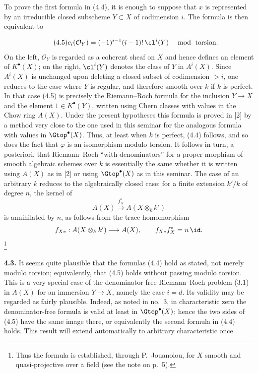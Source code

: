 To prove the first formula in (4.4), it is enough to suppose that $x$ is
represented by an irreducible closed subscheme $Y\subset X$ of codimension
$i$. The formula is then equivalent to

\begin{equation}\tag{4.5}
 c_i(\mathcal O_Y)=(-1)^{i-1}(i-1)!\,\cl^i(Y)
   \quad\bmod\text{ torsion}.
\end{equation}
On the left, $\mathcal O_Y$ is regarded as a coherent sheaf on $X$ and
hence defines an element of $K^\bullet(X)$; on the right,
$\cl^i(Y)$ denotes the class of $Y$ in $A^i(X)$. Since $A^i(X)$ is
unchanged upon deleting a closed subset of codimension $>i$, one reduces
to the case where $Y$ is regular, and therefore smooth over $k$ if $k$ is
perfect. In that case (4.5) is precisely the Riemann--Roch formula for the
inclusion $Y\to X$ and the element $1\in K^\bullet(Y)$, written using
Chern classes with values in the Chow ring $A(X)$. Under the present
hypotheses this formula is proved in [2] by a method very close to the one
used in this seminar for the analogous formula with values in
$\Gtop^\bullet(X)$. Thus, at least when $k$ is perfect, (4.4) follows, and
so does the fact that $\varphi$ is an isomorphism modulo torsion. It follows
in turn, a posteriori, that Riemann--Roch ``with denominators'' for a proper
morphism of smooth algebraic schemes over $k$ is essentially the same
whether it is written using $A(X)$ as in [2] or using $\Gtop^\bullet(X)$ as
in this seminar. The case of an arbitrary $k$ reduces to the algebraically
closed case: for a finite extension $k'/k$ of degree $n$, the kernel of
\[
 A(X)\xrightarrow{f_X^*}A(X\otimes_k k')
\]
is annihilated by $n$, as follows from the trace homomorphism
\[
 f_{X*}:A(X\otimes_k k')\longrightarrow A(X),
 \qquad f_{X*}f_X^*=n\,\id.
\]
\footnote{Thus the formula is established, through P.~Jouanolou, for $X$
smooth and quasi-projective over a field (see the note on p.~5).}

\textbf{4.3.} It seems quite plausible that the formulas (4.4) hold as
stated, not merely modulo torsion; equivalently, that (4.5) holds without
passing modulo torsion. This is a very special case of the denominator-free
Riemann--Roch problem (3.1) in $A(X)$ for an immersion $Y\to X$, namely
the case $i=d$. Its validity may be regarded as fairly plausible. Indeed,
as noted in no.~3, in characteristic zero the denominator-free formula is
valid at least in $\Gtop^\bullet(X)$; hence the two sides of (4.5) have the
same image there, or equivalently the second formula in (4.4) holds. This
result will extend automatically to arbitrary characteristic once

